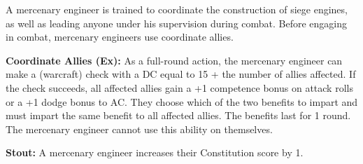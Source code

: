 A mercenary engineer is trained to coordinate the construction of siege engines, as well as leading anyone under his supervision during combat. Before engaging in combat, mercenary engineers use coordinate allies.

\textbf{Coordinate Allies (Ex):} As a full-round action, the mercenary engineer can make a  (warcraft) check with a DC equal to 15 + the number of allies affected. If the check succeeds, all affected allies gain a +1 competence bonus on attack rolls or a +1 dodge bonus to AC. They choose which of the two benefits to impart and must impart the same benefit to all affected allies. The benefits last for 1 round. The mercenary engineer cannot use this ability on themselves.

\textbf{Stout:} A mercenary engineer increases their Constitution score by 1.


